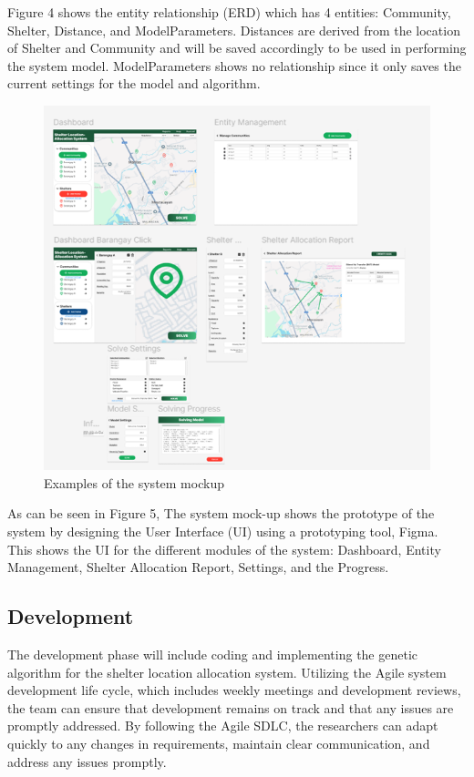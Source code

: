 	Figure 4 shows the entity relationship (ERD) which has 4 entities: Community, Shelter, Distance, and ModelParameters. Distances are derived from the location of Shelter and Community and will be saved accordingly to be used in performing the system model. ModelParameters shows no relationship since it only saves the current settings for the model and algorithm.
	
	\begin{figure}[h!]
		\caption{Examples of the system mockup}
		\centering
		\includegraphics[width=\textwidth]{SYSTEM MOCKUP}
	\end{figure}
	
	As can be seen in Figure 5, The system mock-up shows the prototype of the system by designing the User Interface (UI) using a prototyping tool, Figma. This shows the UI for the different modules of the system: Dashboard, Entity Management, Shelter Allocation Report, Settings, and the Progress.

\subsection{Development}
	The development phase will include coding and implementing the genetic algorithm for the shelter location allocation system. Utilizing the Agile system development life cycle, which includes weekly meetings and development reviews, the team can ensure that development remains on track and that any issues are promptly addressed. By following the Agile SDLC, the researchers can adapt quickly to any changes in requirements, maintain clear communication, and address any issues promptly.
	
